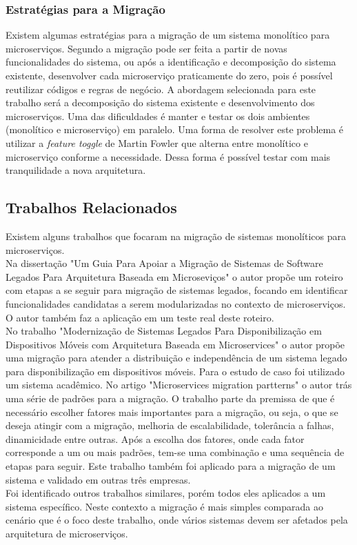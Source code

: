 \documentclass[12pt]{article}
\begin{document}
\subsubsection{Estratégias para a Migração}

Existem algumas estratégias para a migração de um sistema monolítico para microserviços. Segundo \cite{Taibi} a migração pode ser feita a partir de novas funcionalidades do sistema, ou após a identificação e decomposição do sistema existente, desenvolver cada microserviço praticamente do zero, pois é possível reutilizar códigos e regras de negócio. A abordagem selecionada para este trabalho será a decomposição do sistema existente e desenvolvimento dos microserviços. Uma das dificuldades é manter e testar os dois ambientes (monolítico e microserviço) em paralelo. Uma forma de resolver este problema é utilizar a \textit{feature toggle} de Martin Fowler \cite{Carvalho2019} que alterna entre monolítico e microserviço conforme a necessidade. Dessa forma é possível testar com mais tranquilidade a nova arquitetura. 


\subsection{Trabalhos Relacionados}
Existem alguns trabalhos que focaram na migração de sistemas monolíticos para microserviços.
\\Na dissertação "Um Guia Para Apoiar a Migração de Sistemas de Software Legados Para Arquitetura Baseada em Microseviços"\hspace{0.05cm} o autor propõe um roteiro com etapas a se seguir para migração de sistemas legados, focando em identificar funcionalidades candidatas a serem modularizadas no contexto de microserviços. O autor também faz a aplicação em um teste real deste roteiro.
\\No trabalho "Modernização de Sistemas Legados Para Disponibilização em Dispositivos Móveis com Arquitetura Baseada em Microservices" o autor propõe uma migração para atender a distribuição e independência de um sistema legado para disponibilização em dispositivos móveis. Para o estudo de caso foi utilizado um sistema acadêmico.
No artigo "Microservices migration partterns" o autor \cite{Balalaie2018} trás uma série de padrões para a migração. O trabalho parte da premissa de que é necessário escolher fatores mais importantes para a migração, ou seja, o que se deseja atingir com a migração, melhoria de escalabilidade, tolerância a falhas, dinamicidade entre outras. Após a escolha dos fatores, onde cada fator corresponde a um ou mais padrões, tem-se uma combinação e uma sequência de etapas para seguir. Este trabalho também foi aplicado para a migração de um sistema e validado em outras três empresas.
\\Foi identificado outros trabalhos similares, porém todos eles aplicados a um sistema específico. Neste contexto a migração é mais simples comparada ao cenário que é o foco deste trabalho, onde vários sistemas devem ser afetados pela arquitetura de microserviços.
\end{document}
